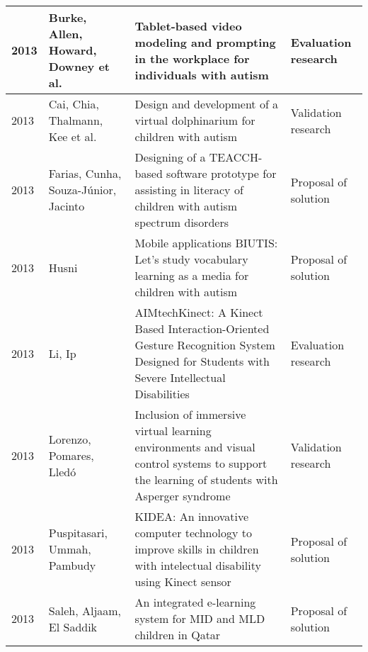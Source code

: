 \documentclass[utf8,english]{gradu3}
\begin{document}
\begin{longtable}{|>{\scriptsize}l|>{\scriptsize}p{3cm}|>{\scriptsize}p{8cm}|>{\scriptsize}p{2.4cm}|}
  2013          & Burke, Allen, Howard, Downey et al.                                  & Tablet-based video modeling and prompting in the workplace for individuals with autism                                                                                                       & Evaluation research        \\ \hline
  2013          & Cai, Chia, Thalmann, Kee et al.                                      & Design and development of a virtual dolphinarium for children with autism                                                                                                                    & Validation research        \\ \hline
  2013          & Farias, Cunha, Souza-Júnior, Jacinto                                 & Designing of a TEACCH-based software prototype for assisting in literacy of children with autism spectrum disorders                                                                          & Proposal of solution       \\ \hline
  2013          & Husni                                                                & Mobile applications BIUTIS: Let's study vocabulary learning as a media for children with autism                                                                                              & Proposal of solution       \\ \hline
  2013          & Li, Ip                                                               & AIMtechKinect: A Kinect Based Interaction-Oriented Gesture Recognition System Designed for Students with Severe Intellectual Disabilities                                                    & Evaluation research        \\ \hline
  2013          & Lorenzo, Pomares, Lledó                                              & Inclusion of immersive virtual learning environments and visual control systems to support the learning of students with Asperger syndrome                                                   & Validation research        \\ \hline
  2013          & Puspitasari, Ummah, Pambudy                                          & KIDEA: An innovative computer technology to improve skills in children with intelectual disability using Kinect sensor                                                                       & Proposal of solution       \\ \hline
  2013          & Saleh, Aljaam, El Saddik                                             & An integrated e-learning system for MID and MLD children in Qatar                                                                                                                            & Proposal of solution       \\ \hline

\end{longtable}
\end{document}
